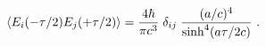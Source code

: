 \begin{equation}\label{viss1}
\langle E_{i}(-\tau/2) E_{j}(+\tau/2) \rangle = 
{4\hbar\over\pi c^3} \; \delta_{ij} \; 
{(a/c)^4 \over \sinh^4(a \tau/2c)}~.
\hfill\qquad\qquad  
\end{equation}

